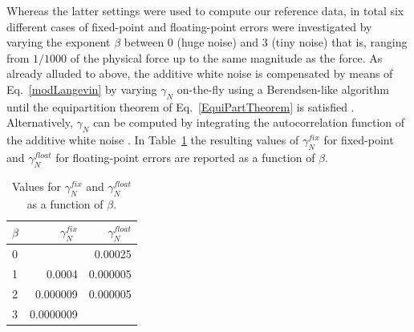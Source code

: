 \documentclass[format=acmsmall,urlbreakonhyphens]{acmart}
\begin{document}
Whereas the latter settings were used to compute our reference data, in total six different cases of fixed-point and floating-point errors were investigated by varying the exponent $\beta$ between 0 (huge noise) and 3 (tiny noise) that is, ranging from $1/1000$ of the physical force up to the same magnitude as the force. %
As already alluded to above, the additive white noise is compensated by means of Eq.~\ref{modLangevin} by varying $\gamma_N$ on-the-fly using a Berendsen-like algorithm until the equipartition theorem of Eq.~\ref{EquiPartTheorem} is satisfied \cite{Berendsen,TDKwater,TDKrev}. Alternatively, $\gamma_N$ can be computed by integrating the autocorrelation function of the additive white noise \cite{RZK}.
In Table~\ref{tab:gamma} the resulting values of \textit{\(\gamma_N^{fix}\)} for fixed-point and \textit{\(\gamma_N^{float}\)} for floating-point errors are reported as a function of \textit{\(\beta\)}. %
\begin{table}
  \caption{Values for \textit{\(\gamma_N^{fix}\)} and \textit{\(\gamma_N^{float}\)} as a function of \textit{\(\beta\)}.}
  \label{tab:gamma}
  \begin{tabular}{lrr}
    \textit{\(\beta\)} & \textit{\(\gamma_N^{fix}\)} & \textit{\(\gamma_N^{float}\)} \\
    \hline
    0 &           & 0.00025  \\
    1 & 0.0004    & 0.000005 \\
    2 & 0.000009  & 0.000005 \\
    3 & 0.0000009 &
  \end{tabular}
\end{table}
\end{document}
